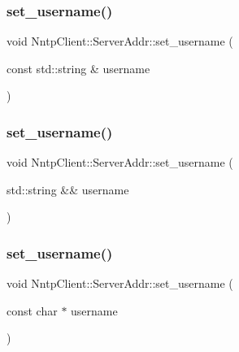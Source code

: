 \hypertarget{class_nntp_client_1_1_server_addr_af0306b61dc76b461403da778665f611c}{}\label{class_nntp_client_1_1_server_addr_af0306b61dc76b461403da778665f611c} 
\subsubsection{\texorpdfstring{set\+\_\+username()}{set\_username()}\hspace{0.1cm}{\footnotesize\ttfamily [1/3]}}
{\footnotesize\ttfamily void Nntp\+Client\+::\+Server\+Addr\+::set\+\_\+username (\begin{DoxyParamCaption}\item[{const std\+::string \&}]{username }\end{DoxyParamCaption})\hspace{0.3cm}{\ttfamily [inline]}}

\hypertarget{class_nntp_client_1_1_server_addr_a8e832fe4605e3bf540169e8725837842}{}\label{class_nntp_client_1_1_server_addr_a8e832fe4605e3bf540169e8725837842} 
\subsubsection{\texorpdfstring{set\+\_\+username()}{set\_username()}\hspace{0.1cm}{\footnotesize\ttfamily [2/3]}}
{\footnotesize\ttfamily void Nntp\+Client\+::\+Server\+Addr\+::set\+\_\+username (\begin{DoxyParamCaption}\item[{std\+::string \&\&}]{username }\end{DoxyParamCaption})\hspace{0.3cm}{\ttfamily [inline]}}

\hypertarget{class_nntp_client_1_1_server_addr_a5ba86685fe0cced320a0c785d59d72b6}{}\label{class_nntp_client_1_1_server_addr_a5ba86685fe0cced320a0c785d59d72b6} 
\subsubsection{\texorpdfstring{set\+\_\+username()}{set\_username()}\hspace{0.1cm}{\footnotesize\ttfamily [3/3]}}
{\footnotesize\ttfamily void Nntp\+Client\+::\+Server\+Addr\+::set\+\_\+username (\begin{DoxyParamCaption}\item[{const char $\ast$}]{username }\end{DoxyParamCaption})\hspace{0.3cm}{\ttfamily [inline]}}



